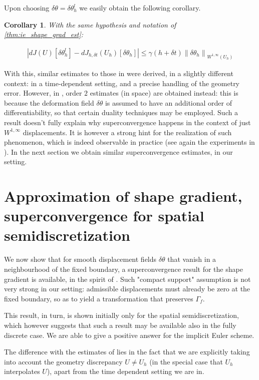 \documentclass[english,a4paper,9pt,oneside]{scrbook}	%
\theoremstyle{break}
\newtheorem{cor}[equation]{Corollary}
\theoremstyle{remark}
\newcommand{\norm}[1]{\left\lVert#1\right\rVert}
\newcommand{\te}{\theta}
\begin{document}
Upon choosing $\delta \te = \delta \te_h^l$ we easily obtain the following corollary.

\begin{cor}

With the same hypothesis and notation of \cref{thm:ie_shape_grad_est}:

\begin{align*}
|dJ(	U)[\delta \te_h^l]-dJ_{h,\delta t}(U_h)[\delta \te_h]|\leq \gamma (h+\delta t)\norm{\delta \te_h}_{W^{1,\infty}(U_h)}
\end{align*}

\end{cor}

With this, similar estimates to those in \cite{paganini} were derived, in a slightly different context: in a time-dependent setting, and a precise handling of the geometry error. However, in \cite{paganini}, order $2$ estimates (in space) are obtained instead: this is because the deformation field $\delta \te$ is assumed to have an additional order of differentiability, so that certain duality techniques may be employed. Such a result doesn't fully explain why superconvergence happens in the context of just $W^{1,\infty}$ displacements. It is however a strong hint for the realization of such phenomenon, which is indeed observable in practice (see again the experiments in \cite{paganini}). In the next section we obtain similar superconvergence estimates, in our setting.


\section{Approximation of shape gradient, superconvergence for spatial semidiscretization}
\label{sec:superconv}

We now show that for smooth displacement fields $\delta \te$ that vanish in a neighbourhood of the fixed boundary, a superconvergence result for the shape gradient is available, in the spirit of \cite{paganini}. Such "compact support" assumption is not very strong in our setting: admissible displacements must already be zero at the fixed boundary, so as to yield a transformation that preserves $\Gamma_f$.

This result, in turn, is shown initially only for the spatial semidiscretization, which however suggests that such a result may be available also in the fully discrete case. We are able to give a positive answer for the implicit Euler scheme.

The difference with the estimates of \cite{paganini} lies in the fact that we are explicitly taking into account the geometry discrepancy $U \neq U_h$ (in the special case that $U_h$ interpolates $U$), apart from the time dependent setting we are in.
\end{document}
